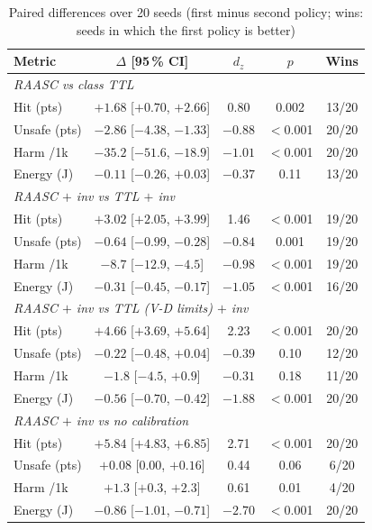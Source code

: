 \documentclass[journal]{IEEEtran}
\newcommand{\pct}{\,\%}
\begin{document}
\begin{table}[!t]
\caption{Paired differences over 20 seeds (first minus second policy; wins: seeds in which the first policy is better)}
\label{tab:paired}
\centering\scriptsize
\setlength{\tabcolsep}{2pt}
\begin{tabular}{lcccc}
\toprule
Metric & $\Delta$ [95\pct{} CI] & $d_z$ & $p$ & Wins\\
\midrule
\multicolumn{5}{l}{\emph{RAASC vs class TTL}}\\
Hit (pts) & $+1.68$ [$+0.70$, $+2.66$] & 0.80 & 0.002 & 13/20\\
Unsafe (pts) & $-2.86$ [$-4.38$, $-1.33$] & $-0.88$ & $<$0.001 & 20/20\\
Harm /1k & $-35.2$ [$-51.6$, $-18.9$] & $-1.01$ & $<$0.001 & 20/20\\
Energy (J) & $-0.11$ [$-0.26$, $+0.03$] & $-0.37$ & 0.11 & 13/20\\
\multicolumn{5}{l}{\emph{RAASC $+$ inv vs TTL $+$ inv}}\\
Hit (pts) & $+3.02$ [$+2.05$, $+3.99$] & 1.46 & $<$0.001 & 19/20\\
Unsafe (pts) & $-0.64$ [$-0.99$, $-0.28$] & $-0.84$ & 0.001 & 19/20\\
Harm /1k & $-8.7$ [$-12.9$, $-4.5$] & $-0.98$ & $<$0.001 & 19/20\\
Energy (J) & $-0.31$ [$-0.45$, $-0.17$] & $-1.05$ & $<$0.001 & 16/20\\
\multicolumn{5}{l}{\emph{RAASC $+$ inv vs TTL (V-D limits) $+$ inv}}\\
Hit (pts) & $+4.66$ [$+3.69$, $+5.64$] & 2.23 & $<$0.001 & 20/20\\
Unsafe (pts) & $-0.22$ [$-0.48$, $+0.04$] & $-0.39$ & 0.10 & 12/20\\
Harm /1k & $-1.8$ [$-4.5$, $+0.9$] & $-0.31$ & 0.18 & 11/20\\
Energy (J) & $-0.56$ [$-0.70$, $-0.42$] & $-1.88$ & $<$0.001 & 20/20\\
\multicolumn{5}{l}{\emph{RAASC $+$ inv vs no calibration}}\\
Hit (pts) & $+5.84$ [$+4.83$, $+6.85$] & 2.71 & $<$0.001 & 20/20\\
Unsafe (pts) & $+0.08$ [0.00, $+0.16$] & 0.44 & 0.06 & 6/20\\
Harm /1k & $+1.3$ [$+0.3$, $+2.3$] & 0.61 & 0.01 & 4/20\\
Energy (J) & $-0.86$ [$-1.01$, $-0.71$] & $-2.70$ & $<$0.001 & 20/20\\
\bottomrule
\end{tabular}
\end{table}
\end{document}
